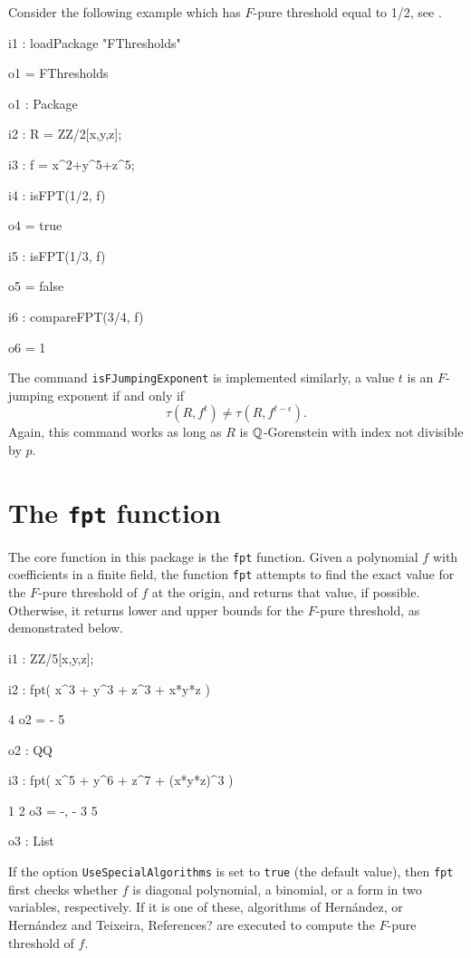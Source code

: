 \documentclass{amsart}
\begin{document}
Consider the following example which has $F$-pure threshold equal to {1/2}, see \cite[Example 4.3]{MustataYoshidaTestIdealVsMultiplierIdeals}.
\medskip
{\small
{}
\begin{MyVerbatim}
i1 : loadPackage "FThresholds"

o1 = FThresholds

o1 : Package

i2 : R = ZZ/2[x,y,z];

i3 : f = x^2+y^5+z^5;

i4 : isFPT(1/2, f)

o4 = true

i5 : isFPT(1/3, f)

o5 = false

i6 : compareFPT(3/4, f)

o6 = 1
\end{MyVerbatim}
}
\medskip

The command {\tt isFJumpingExponent} is implemented similarly, a value $t$ is an $F$-jumping exponent if and only if
\[
\tau(R, f^t) \neq \tau(R, f^{t-\epsilon}).  
\]
Again, this command works as long as $R$ is $\mathbb{Q}$-Gorenstein with index not divisible by $p$. 


\newpage
\section{The {\tt fpt} function}
\label{sec.FPT}

The core function in this package is the {\tt fpt} function.  Given a polynomial $f$ with coefficients in a finite field, the function {\tt fpt} attempts to find the exact value for the $F$-pure threshold of $f$ at the origin, and returns that value, if possible.  Otherwise, it returns lower and upper bounds for the $F$-pure threshold, as demonstrated below.
     
\medskip
{\small
{}
\begin{MyVerbatim}
i1 : ZZ/5[x,y,z];

i2 : fpt( x^3 + y^3 + z^3 + x*y*z )

     4
o2 = -
     5

o2 : QQ

i3 : fpt( x^5 + y^6 + z^7 + (x*y*z)^3 )

      1  2
o3 = {-, -}
      3  5

o3 : List
\end{MyVerbatim}
}
            
             If the option {\tt UseSpecialAlgorithms} is set to {\tt true} (the default value), then {\tt fpt} first checks whether $f$ is diagonal polynomial, a binomial, or a form in two variables, respectively.
             If it is one of these, algorithms of Hern\'andez, or Hern\'andez and Teixeira, {\color{red}  References?} are executed to compute the $F$-pure threshold of $f$.
\end{document}
